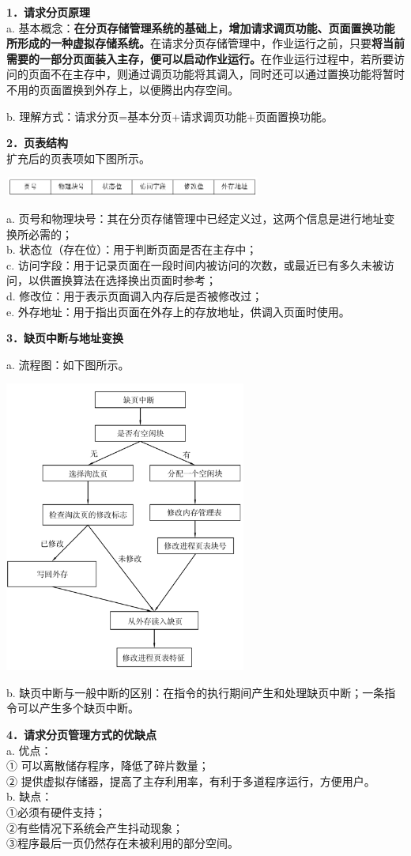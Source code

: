 \textbf{{1．请求分页原理}}\\

a.
基本概念：\textbf{在分页存储管理系统的基础上，增加请求调页功能、页面置换功能所形成的一种虚拟存储系统。}在请求分页存储管理中，作业运行之前，只要\textbf{将当前需要的一部分页面装入主存，便可以启动作业运行。}在作业运行过程中，若所要访问的页面不在主存中，则通过调页功能将其调入，同时还可以通过置换功能将暂时不用的页面置换到外存上，以便腾出内存空间。

{{b. 理解方式：}请求分页=基本分页+请求调页功能+页面置换功能。}

\textbf{{2．页表结构}}\\

扩充后的页表项如下图所示。

\includegraphics[width=3.33333in,height=0.25000in]{png-jpeg-pics/27CA7AD5C5B3164778806183FB4A0D06.png}

a.
页号和物理块号：其在分页存储管理中已经定义过，这两个信息是进行地址变换所必需的；\\
b. 状态位（存在位）：用于判断页面是否在主存中；\\
c.
访问字段：用于记录页面在一段时间内被访问的次数，或最近已有多久未被访问，以供置换算法在选择换出页面时参考；\\
d. 修改位：用于表示页面调入内存后是否被修改过；\\
e. 外存地址：用于指出页面在外存上的存放地址，供调入页面时使用。

\textbf{{3．缺页中断与地址变换}}

a. 流程图：如下图所示。~

\includegraphics[width=3.12500in,height=3.78125in]{png-jpeg-pics/7A06B8CD61CF71DE38B4A51F2AC07589.png}

b.
缺页中断与一般中断的区别：在指令的执行期间产生和处理缺页中断；一条指令可以产生多个缺页中断。

\textbf{{4．请求分页管理方式的优缺点}}\\
a. 优点：\\
① 可以离散储存程序，降低了碎片数量；\\
② 提供虚拟存储器，提高了主存利用率，有利于多道程序运行，方便用户。\\
b. 缺点：\\
①必须有硬件支持；\\
②有些情况下系统会产生抖动现象；\\
③程序最后一页仍然存在未被利用的部分空间。
